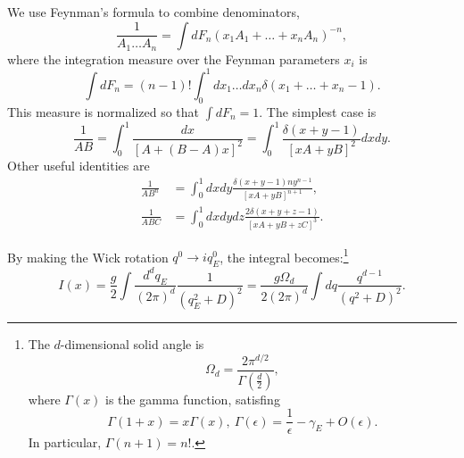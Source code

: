 \begin{framedrmk}
We use Feynman's formula to combine denominators,
\begin{equation}
\frac{1}{A_{1} \ldots A_{n}}=\int d F_{n}\left(x_{1} A_{1}+\ldots+x_{n} A_{n}\right)^{-n},
\end{equation}
where the integration measure over the Feynman parameters $x_{i}$ is
\begin{equation}
\int d F_{n}=(n-1) ! \int_{0}^{1} d x_{1} \ldots d x_{n} \delta\left(x_{1}+\ldots+x_{n}-1\right).
\end{equation}
This measure is normalized so that $\int d F_{n} =1$. 
The simplest case is
\begin{equation}
\frac{1}{A B}=\int_{0}^{1} \frac{dx}{[A+(B-A) x]^{2}}
=\int_{0}^{1} \frac{\delta(x+y-1)}{[x A+y B]^{2}} dx dy.
\end{equation}
Other useful identities are
\begin{equation}
\begin{aligned}
\frac{1}{A B^{n}} &=\int_{0}^{1} dxdy\frac{\delta(x+y-1)n y^{n-1}}{[x A+y B]^{n+1}} , \\
\frac{1}{A B C} &=\int_{0}^{1} dxdydz \frac{2\delta(x+y+z-1)}{[x A+y B+z C]^{3}} .
\end{aligned}
\end{equation}
\end{framedrmk}


By making the Wick rotation $q^0 \rightarrow i q_E^0$, the integral becomes:\footnote{
	The $d$-dimensional solid angle is
	\begin{equation}
		\Omega_d = \frac{2\pi^{d/2}}{\Gamma(\frac{d}{2})},
	\end{equation}
	where $\Gamma(x)$ is the gamma function, satisfing
	\begin{equation}
		\Gamma(1+x) = x\Gamma(x),\ 
		\Gamma(\epsilon) = \frac{1}{\epsilon}-\gamma_E + O(\epsilon).
	\end{equation}
	In particular, $\Gamma(n+1)=n!$.
}
\begin{equation*}
I(x) = \frac{g}{2}\int \frac{d^d q_E}{(2 \pi)^d} \frac{1}{\left(q_E^{2}+D\right)^{2}}
=\frac{g\Omega_d}{2(2\pi)^d} \int dq \frac{q^{d-1}}{\left(q^{2}+D\right)^{2}}.
\end{equation*}


